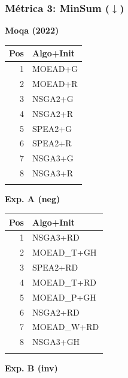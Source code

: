 \documentclass[a4paper,10pt]{article}
\begin{document}
\subsubsection{Métrica 3: MinSum \texorpdfstring{($\downarrow$)}{(down)}}
\begin{table}[H]
    \centering
    \begin{minipage}[t]{0.32\textwidth}
        \centering\scriptsize\textbf{Moqa (2022)}\\
        \begin{tabular}{rl}
            \toprule
            Pos & Algo+Init \\ \midrule
            1 & MOEAD+G \\
            2 & MOEAD+R \\
            3 & NSGA2+G \\
            4 & NSGA2+R \\
            5 & SPEA2+G \\
            6 & SPEA2+R \\
            7 & NSGA3+G \\
            8 & NSGA3+R \\
            \\
            \bottomrule
        \end{tabular}
    \end{minipage}
    \hfill
    \begin{minipage}[t]{0.32\textwidth}
        \centering\scriptsize\textbf{Exp. A (neg)}\\
        \begin{tabular}{rl}
            \toprule
            Pos & Algo+Init \\ \midrule
            1 & NSGA3+RD \\
            2 & MOEAD\_T+GH \\
            3 & SPEA2+RD \\
            4 & MOEAD\_T+RD \\
            5 & MOEAD\_P+GH \\
            6 & NSGA2+RD \\
            7 & MOEAD\_W+RD \\
            8 & NSGA3+GH \\
            \\
            \bottomrule
        \end{tabular}
    \end{minipage}
    \hfill
    \begin{minipage}[t]{0.32\textwidth}
        \centering\scriptsize\textbf{Exp. B (inv)}\\

\end{minipage}
\end{table}
\end{document}
